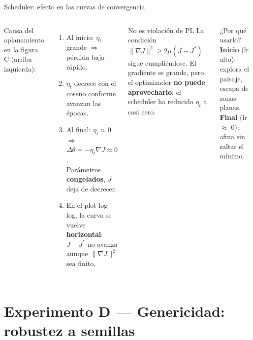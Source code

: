 \documentclass[10pt]{beamer}
\begin{document}
\begin{frame}{Scheduler: efecto en las curvas de convergencia}
\small
\begin{columns}

Causa del aplanamiento en la figura C (arriba-izquierda):

\smallskip
\begin{enumerate}\itemsep3pt
  \item Al inicio: $\eta_t$ grande $\Rightarrow$ pérdida baja rápido.
  \item $\eta_t$ decrece con el coseno conforme avanzan las épocas.
  \item Al final: $\eta_t \approx 0$ $\Rightarrow$ $\Delta\theta = -\eta_t\nabla J \approx 0$.\\
  Parámetros \textbf{congelados}, $J$ deja de decrecer.
  \item En el plot log-log, la curva se vuelve \textbf{horizontal}: $J{-}J^*$ no avanza aunque $\|\nabla J\|^2$ sea finito.
\end{enumerate}

\begin{alertblock}{No es violación de PL}
  La condición $\|\nabla J\|^2 \geq 2\mu(J{-}J^*)$ sigue cumpliéndose. El gradiente es grande, pero el optimizador \textbf{no puede aprovecharlo}: el scheduler ha reducido $\eta_t$ a casi cero.
\end{alertblock}

\smallskip
\begin{block}{¿Por qué usarlo?}
  \textbf{Inicio} (lr alto): explora el paisaje, escapa de zonas planas.\\
  \textbf{Final} (lr $\approx$ 0): afina sin saltar el mínimo.
\end{block}
\end{columns}

\end{frame}

\section{Experimento D — Genericidad: robustez a semillas}
\end{document}
